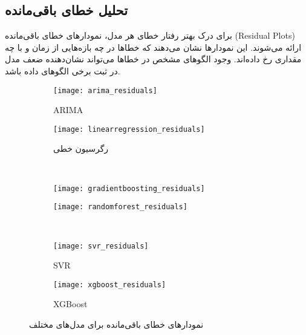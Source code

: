 









\subsection{تحلیل خطای باقی‌مانده}
برای درک بهتر رفتار خطای هر مدل، نمودارهای خطای باقی‌مانده (Residual Plots) ارائه می‌شوند. این نمودارها نشان می‌دهند که خطاها در چه بازه‌هایی از زمان و با چه مقداری رخ داده‌اند. وجود الگوهای مشخص در خطاها می‌تواند نشان‌دهنده ضعف مدل در ثبت برخی الگوهای داده باشد.

\begin{figure}[H]
	\centering
	\begin{subfigure}{0.48\textwidth}
		\centering
		\texttt{[image: arima\_residuals]}
		\caption{ARIMA}
		\label{fig:arima_residuals}
	\end{subfigure}
	\hfill
	\begin{subfigure}{0.48\textwidth}
		\centering
		\texttt{[image: linearregression\_residuals]}
		\caption{رگرسیون خطی}
		\label{fig:linearregression_residuals}
	\end{subfigure}
	\\
	\begin{subfigure}{0.48\textwidth}
		\centering
		\texttt{[image: gradientboosting\_residuals]}
		\caption{}
		\label{fig:gradientboosting_residuals}
	\end{subfigure}
	\hfill
	\begin{subfigure}{0.48\textwidth}
		\centering
		\texttt{[image: randomforest\_residuals]}
		\caption{}
		\label{fig:randomforest_residuals}
	\end{subfigure}
	\\
	\begin{subfigure}{0.48\textwidth}
		\centering
		\texttt{[image: svr\_residuals]}
		\caption{SVR}
		\label{fig:svr_residuals}
	\end{subfigure}
	\hfill
	\begin{subfigure}{0.48\textwidth}
		\centering
		\texttt{[image: xgboost\_residuals]}
		\caption{XGBoost}
		\label{fig:xgboost_residuals}
	\end{subfigure}
	\caption{نمودارهای خطای باقی‌مانده برای مدل‌های مختلف}
	\label{fig:residual_plots}
\end{figure}



